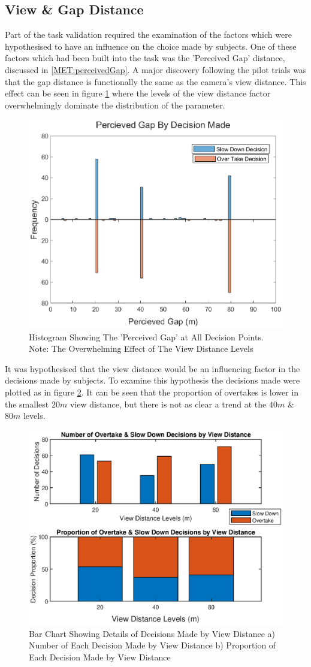 \subsection{View \& Gap Distance}
Part of the task validation required the examination of the factors which were hypothesised to have an influence on the choice made by subjects. One of these factors which had been built into the task was the 'Perceived Gap' distance, discussed in \ref{MET:perceivedGap}. A major discovery following the pilot trials was that the gap distance is functionally the same as the camera's view distance. This effect can be seen in figure \ref{fig:Gap_more_like_view} where the levels of the view distance factor overwhelmingly dominate the distribution of the parameter.
\begin{figure}[H]
    \centering
    \includegraphics[width=0.6\linewidth]{figures/gap_hist.eps}
    \caption{Histogram Showing The 'Perceived Gap' at All Decision Points. Note: The Overwhelming Effect of The View Distance Levels}
    \label{fig:Gap_more_like_view}
\end{figure}

It was hypothesised that the view distance would be an influencing factor in the decisions made by subjects. To examine this hypothesis the decisions made were plotted as in figure \ref{fig:Proportion by View Dist}. It can be seen that the proportion of overtakes is lower in the smallest $20m$ view distance, but there is not as clear a trend at the $40m$ \& $80m$ levels.
\begin{figure}[H]
    \centering
    \includegraphics[width=0.6\linewidth]{figures/Proportions_by_viewdist.eps}
    \caption{Bar Chart Showing Details of Decisions Made by View Distance a) Number of Each Decision Made by View Distance b) Proportion of Each Decision Made by View Distance}
    \label{fig:Proportion by View Dist}
\end{figure}

